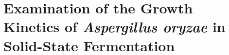 \chapter{Examination of the Growth Kinetics of \emph{Aspergillus oryzae} in Solid-State Fermentation}\label{ch:KinSolidSub}







